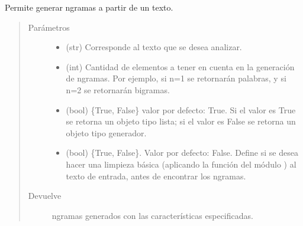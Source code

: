 \documentclass[letterpaper,10pt,openany,spanish]{sphinxmanual}
\begin{document}
\begin{fulllineitems}
\label{\detokenize{funciones/exploracion:exploracion.obtener_ngramas}}
Permite generar n\sphinxhyphen{}gramas a partir de un texto.
\begin{quote}\begin{description}
\item[{Parámetros}] \leavevmode\begin{itemize}
\item {} 
 \textendash{} (str) Corresponde al texto que se desea analizar.

\item {} 
 \textendash{} (int) Cantidad de elementos a tener en cuenta en la generación de n\sphinxhyphen{}gramas. Por ejemplo, si n=1 se retornarán palabras, y si n=2 se retornarán bigramas.

\item {} 
 \textendash{} (bool) \{True, False\} valor por defecto: True. Si el valor es True se retorna un objeto tipo lista; si el valor es False se retorna un objeto tipo generador.

\item {} 
 \textendash{} (bool) \{True, False\}. Valor por defecto: False. Define         si se desea hacer una limpieza básica (aplicando la función           del módulo ) al texto de entrada, antes de encontrar los n\sphinxhyphen{}gramas.

\end{itemize}

\item[{Devuelve}] \leavevmode
n\sphinxhyphen{}gramas generados con las características especificadas.

\end{description}\end{quote}

\end{fulllineitems}

\end{document}
